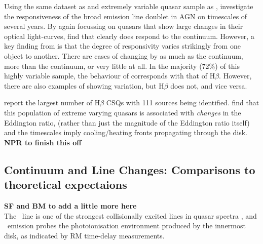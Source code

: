 \documentclass[fleqn,usenatbib]{mnras}
\begin{document}
Using the same dataset as and extremely variable quasar sample
as \citet{MacLeod2019}, \citet{Homan2019}
investigate the responsiveness of the \mgii broad emission line
doublet in AGN on timescales of several years.  By again focussing on quasars that show large
changes in their optical light-curves, \citet{Homan2019} find that
\mgii clearly does respond to the continuum.  However, a key finding
from \citet{Homan2019} is that the degree of responsivity varies
strikingly from one object to another.  There are cases of \mgii
changing by as much as the continuum, more than the continuum, or very
little at all.  In the majority (72\%) of this highly variable sample,
the behaviour of \mgii corresponds with that of H$\beta$.  However,
there are also examples of \mgii showing variation, but H$\beta$ does
not, and vice versa.

\citet{Graham2019b} report the largest number of H$\beta$ CSQs with 111
sources being identified. \citet{Graham2019b} find that this population
of extreme varying quasars is associated with {\it changes} in the
Eddington ratio, (rather than just the magnitude of the Eddington
ratio itself) and the timescales imply cooling/heating fronts
propagating through the disk.\\
{\bf NPR to finish this off} \\


\subsection{Continuum and Line Changes: Comparisons to theoretical expectaions}
{\bf SF and BM to add a little more here}\\
The \civ\ line is one of the strongest collisionally excited lines in quasar spectra \citep[e.g.][]{HamannFerland1999}, and \civ\ emission probes the photoionisation environment produced by the innermost disk, as indicated by RM time-delay measurements.
\end{document}
